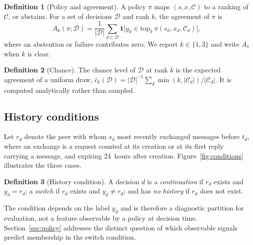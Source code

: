 \documentclass[11pt]{article}
\theoremstyle{definition}
\newtheorem{definition}{Definition}
\newcommand{\agr}[1]{A_{#1}}
\newcommand{\C}{\mathcal{C}}
\newcommand{\D}{\mathcal{D}}
\newcommand{\ind}{\mathbf{1}}
\begin{document}
\begin{definition}[Policy and agreement]
A policy $\pi$ maps $(s, x, \C)$ to a ranking of $\C$, or abstains. For a set of decisions $\D$ and rank $k$, the agreement of $\pi$ is
\begin{equation}
\agr{k}(\pi;\D) = \frac{1}{|\D|} \sum_{d \in \D} \ind\big[y_d \in \mathrm{top}_k\, \pi(s_d, x_d, \C_d)\big],
\end{equation}
where an abstention or failure contributes zero. We report $k \in \{1, 3\}$ and write $\agr{1}$ when $k$ is clear.
\end{definition}

\begin{definition}[Chance]
The chance level of $\D$ at rank $k$ is the expected agreement of a uniform draw, $\bar c_k(\D) = |\D|^{-1} \sum_{d} \min(k, |\C_d|)/|\C_d|$. It is computed analytically rather than sampled.
\end{definition}

\subsection{History conditions}

Let $r_d$ denote the peer with whom $s_d$ most recently exchanged messages before $t_d$, where an exchange is a request counted at its creation or at its first reply carrying a message, and expiring 24~hours after creation. Figure~\ref{fig:conditions} illustrates the three cases.

\begin{definition}[History condition]
A decision $d$ is a \emph{continuation} if $r_d$ exists and $y_d = r_d$; a \emph{switch} if $r_d$ exists and $y_d \ne r_d$; and has \emph{no history} if $r_d$ does not exist.
\end{definition}

The condition depends on the label $y_d$ and is therefore a diagnostic partition for evaluation, not a feature observable by a policy at decision time. Section~\ref{sec:policy} addresses the distinct question of which observable signals predict membership in the switch condition.
\end{document}
